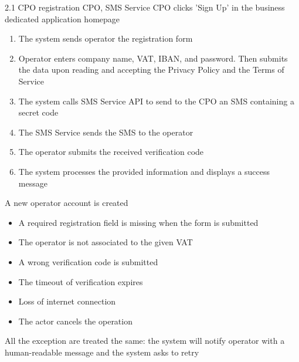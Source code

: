 \usecase
{
}
{2.1}
{CPO registration} %
{CPO, SMS Service} %
{CPO clicks 'Sign Up' in the business dedicated application homepage} %
{ %
    \begin{enumerate}
        \item The system sends operator the registration form
        \item Operator enters company name, VAT, IBAN, and password. Then submits the data upon reading and accepting the Privacy Policy and the Terms of Service
        \item The system calls SMS Service API to send to the CPO an SMS containing a secret code
        \item The SMS Service sends the SMS to the operator
        \item The operator submits the received verification code
        \item The system processes the provided information and displays a success message
    \end{enumerate}
}
{A new operator account is created} %
{ %
    \begin{itemize}
        \item A required registration field is missing when the form is submitted
        \item The operator is not associated to the given VAT
        \item A wrong verification code is submitted
        \item The timeout of verification expires
        \item Loss of internet connection
        \item The actor cancels the operation
    \end{itemize}
}
{ %
    All the exception are treated the same: the system will notify operator with a human-readable message and the system asks to retry
}

